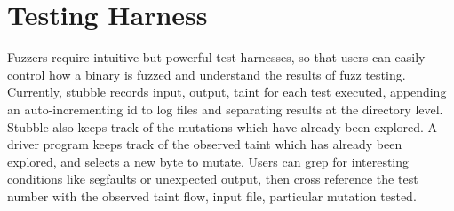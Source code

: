 \documentclass[11pt,expanded,copyright]{fsuthesis}
\begin{document}

	
	
\section{Testing Harness}

Fuzzers require intuitive but powerful test harnesses, so that users can easily control how a binary is fuzzed and understand the results of fuzz testing. Currently, stubble records input, output, taint for each test executed, appending an auto-incrementing id to log files and separating results at the directory level. Stubble also keeps track of the mutations which have already been explored. A driver program keeps track of the observed taint which has already been explored, and selects a new byte to mutate. Users can grep for interesting conditions like segfaults or unexpected output, then cross reference the test number with the observed taint flow, input file, particular mutation tested.



\end{document}

